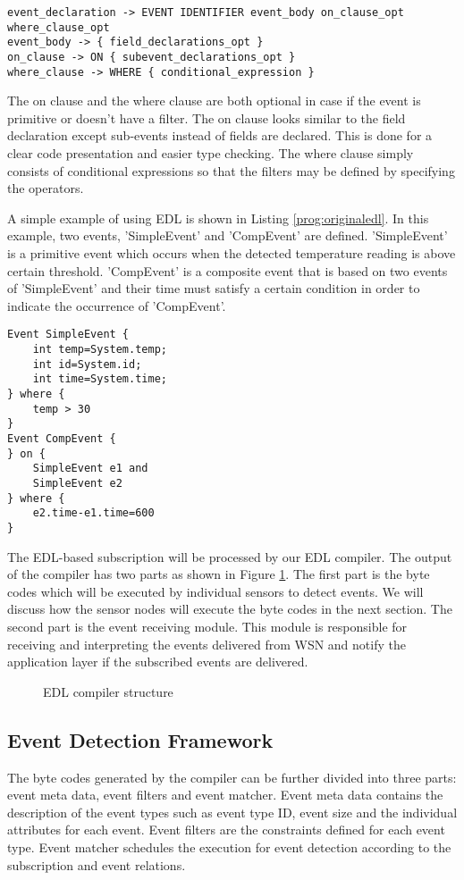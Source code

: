 \begin{lstlisting}[caption=BNF (simplified) of event type, label=prog:BNFEvent]
event_declaration -> EVENT IDENTIFIER event_body on_clause_opt where_clause_opt
event_body -> { field_declarations_opt }
on_clause -> ON { subevent_declarations_opt }
where_clause -> WHERE { conditional_expression }
\end{lstlisting}

The on clause and the where clause are both optional in case if the event is primitive or doesn't have a filter. The on clause looks similar to the field declaration except sub-events instead of fields are declared. This is done for a clear code presentation and easier type checking. The where clause simply consists of conditional expressions so that the filters may be defined by specifying the operators.

A simple example of using EDL is shown in Listing \ref{prog:originaledl}. In this example, two events, 'SimpleEvent' and 'CompEvent' are defined. 'SimpleEvent' is a primitive event which occurs when the detected temperature reading is above certain threshold. 'CompEvent' is a composite event that is based on two events of 'SimpleEvent' and their time must satisfy a certain condition in order to indicate the occurrence of 'CompEvent'.
\begin{lstlisting}[caption=A simple EDL program, label=prog:originaledl]
Event SimpleEvent {
	int temp=System.temp;
	int id=System.id;
	int time=System.time;
} where {
	temp > 30
}
Event CompEvent {
} on {
	SimpleEvent e1 and
	SimpleEvent e2
} where {
	e2.time-e1.time=600
}
\end{lstlisting}

The EDL-based subscription will be processed by our EDL compiler. The output of the compiler has two parts as shown in Figure \ref{fig:edlcompiler}. The first part is the byte codes which will be executed by individual sensors to detect events. We will discuss how the sensor nodes will execute the byte codes in the next section. The second part is the event receiving module. This module is responsible for receiving and interpreting the events delivered from WSN and notify the application layer if the subscribed events are delivered.

\begin{figure}
\centering
{}
\caption{EDL compiler structure}
\label{fig:edlcompiler}
\end{figure}

\subsection{Event Detection Framework}
The byte codes generated by the compiler can be further divided into three parts: event meta data, event filters and event matcher. Event meta data contains the description of the event types such as event type ID, event size and the individual attributes for each event. Event filters are the constraints defined for each event type. Event matcher schedules the execution for event detection according to the subscription and event relations.

